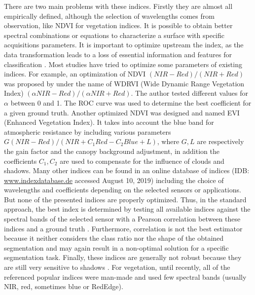 \documentclass[../thesis.tex]{subfiles}
\begin{document}
	There are two main problems with these indices. Firstly they are almost all empirically defined, although the selection of wavelengths comes from observation, like NDVI for vegetation indices. It is possible to obtain better spectral combinations or equations to characterize a surface with specific acquisitions parameters. It is important to optimize upstream the index, as the data transformation leads to a loss of essential information and features for classification \cite{Zhang2015}. Most studies have tried to optimize some parameters of existing indices. For example, an optimization of NDVI $(NIR-Red)/(NIR+Red)$ was proposed by \cite{gitelson2004wide} under the name of WDRVI (Wide Dynamic Range Vegetation Index) $(\alpha NIR - Red)/(\alpha NIR + Red)$. The author tested different values for $\alpha$ between 0 and 1. The ROC curve was used to determine the best coefficient for a given ground truth. Another optimized NDVI was designed and named EVI (Enhanced Vegetation Index). It takes into account the blue band for atmospheric resistance by including various parameters $G (NIR-Red) / (NIR + C_1 Red - C_2 Blue +L)$, where $G,L$ are respectively the gain factor and the canopy background adjustment, in addition the coefficients $C_1,C_2$ are used to compensate for the influence of clouds and shadows. Many other indices can be found in an online database of indices ({IDB}: \url{www.indexdatabase.de} accessed August 10, 2019) %
	 \cite{henrich2009development} including the choice of wavelengths and coefficients depending on the selected sensors or applications. But none of the presented indices are properly optimized. Thus, in the standard approach, the best index is determined by testing all available indices against the spectral bands of the selected sensor with a Pearson correlation between these indices and a ground truth \cite{Liu2017, Kokhan119808}. Furthermore, correlation is not the best estimator because it neither considers the class ratio nor the shape of the obtained segmentation and may again result in a non-optimal solution for a specific segmentation task. Finally, these indices are generally not robust because they are still very sensitive to shadows \cite{Zhang2015}. For vegetation, until recently, all of the referenced popular indices were man-made and used few spectral bands (usually NIR, red, sometimes blue or RedEdge).
	
\end{document}
